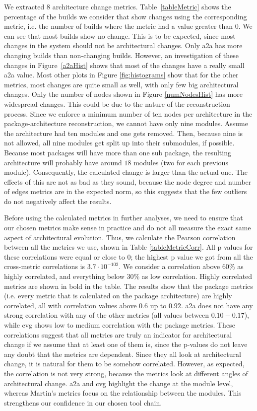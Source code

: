 \documentclass[sigconf, anonymous, review]{acmart}
\begin{document}
We extracted 8 architecture change metrics. 
Table~\ref{tableMetric} shows the percentage of the builds we consider that show changes using the corresponding metric, i.e. the number of builds where the metric had a value greater than 0.
We can see that most builds show no change.
This is to be expected, since most changes in the system should not be architectural changes. 
Only a2a has more changing builds than non-changing builds. 
However, an investigation of these changes in Figure~\ref{a2aHist} shows that most of the changes have a really small a2a value. 
Most other plots in Figure \ref{fig:histograms} show that for the other metrics, most changes are quite small as well, with only few big architectural changes. 
Only the number of nodes shown in Figure \ref{numNodesHist} has more widespread changes.
This could be due to the nature of the reconstruction process. Since we enforce a minimum number of ten nodes per architecture in the package-architecture reconstruction, we cannot have only nine modules. 
Assume the architecture had ten modules and one gets removed. Then, because nine is not allowed, all nine modules get split up into their submodules, if possible. 
Because most packages will have more than one sub package, the resulting architecture will probably have around $18$ modules (two for each previous module). Consequently, the calculated change is larger than the actual one.
The effects of this are not as bad as they sound, because the node degree and number of edges metrics are in the expected norm, so this suggests that the few outliers do not negatively affect the results.

Before using the calculated metrics in further analyses, we need to ensure that our chosen metrics make sense in practice and do not all measure the exact same aspect of architectural evolution. Thus, we calculate the Pearson correlation between all the metrics we use, shown in Table \ref{tableMetricCorr}. All p values for these correlations were equal or close to 0; the highest p value we got from all the cross-metric correlations is $3.7 \cdot 10^{-102}$. 
We consider a correlation above $60\%$ as highly correlated, and everything below $30\%$ as low correlation.
Highly correlated metrics are shown in bold in the table.
The results show that the package metrics (i.e. every metric that is calculated on the package architecture) are highly correlated, all with correlation values above $0.6$ up to $0.92$. a2a does not have any strong correlation with any of the other metrics (all values between $0.10-0.17$), while cvg shows low to medium correlation with the package metrics. 
These correlations suggest that all metrics are truly an indicator for architectural change if we assume that at least one of them is, since the p-values do not leave any doubt that the metrics are dependent.
 Since they all look at architectural change, it is natural for them to be somehow correlated. 
However, as expected, the correlation is not very strong, because the metrics look at different angles of architectural change.
a2a and cvg highlight the change at the module level, whereas Martin's metrics focus on the relationship between the modules. This strengthens our confidence in our chosen tool chain.
\end{document}
